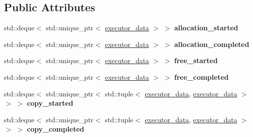 \subsection*{Public Attributes}
\begin{DoxyCompactItemize}
\item 
\mbox{\label{structgko_1_1log_1_1Record_1_1logged__data_ad5daba4ec69cb54bbd7d3372e0925a6d}} 
std\+::deque$<$ std\+::unique\+\_\+ptr$<$ \hyperlink{structgko_1_1log_1_1executor__data}{executor\+\_\+data} $>$ $>$ {\bfseries allocation\+\_\+started}
\item 
\mbox{\label{structgko_1_1log_1_1Record_1_1logged__data_a0442990cc7391e2a64bd91ec66c1714e}} 
std\+::deque$<$ std\+::unique\+\_\+ptr$<$ \hyperlink{structgko_1_1log_1_1executor__data}{executor\+\_\+data} $>$ $>$ {\bfseries allocation\+\_\+completed}
\item 
\mbox{\label{structgko_1_1log_1_1Record_1_1logged__data_ac699daf369561ab3941256ce57365957}} 
std\+::deque$<$ std\+::unique\+\_\+ptr$<$ \hyperlink{structgko_1_1log_1_1executor__data}{executor\+\_\+data} $>$ $>$ {\bfseries free\+\_\+started}
\item 
\mbox{\label{structgko_1_1log_1_1Record_1_1logged__data_a65ce6c300d048317f67191c68b667e32}} 
std\+::deque$<$ std\+::unique\+\_\+ptr$<$ \hyperlink{structgko_1_1log_1_1executor__data}{executor\+\_\+data} $>$ $>$ {\bfseries free\+\_\+completed}
\item 
\mbox{\label{structgko_1_1log_1_1Record_1_1logged__data_a344272b69a3717472f89885258db9a14}} 
std\+::deque$<$ std\+::unique\+\_\+ptr$<$ std\+::tuple$<$ \hyperlink{structgko_1_1log_1_1executor__data}{executor\+\_\+data}, \hyperlink{structgko_1_1log_1_1executor__data}{executor\+\_\+data} $>$ $>$ $>$ {\bfseries copy\+\_\+started}
\item 
\mbox{\label{structgko_1_1log_1_1Record_1_1logged__data_acb75163d3a603ab711999122d65ef091}} 
std\+::deque$<$ std\+::unique\+\_\+ptr$<$ std\+::tuple$<$ \hyperlink{structgko_1_1log_1_1executor__data}{executor\+\_\+data}, \hyperlink{structgko_1_1log_1_1executor__data}{executor\+\_\+data} $>$ $>$ $>$ {\bfseries copy\+\_\+completed}

\end{DoxyCompactItemize}
